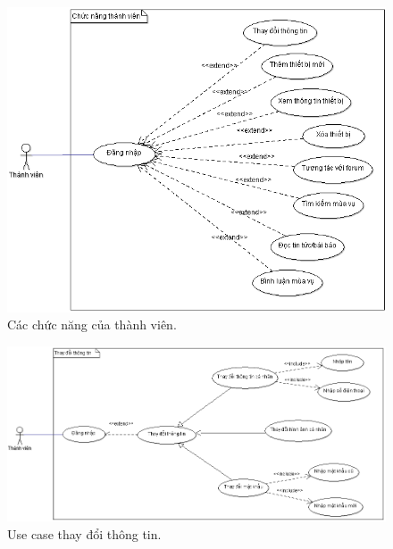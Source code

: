 \documentclass[a4paper,12pt,oneside]{article}
\begin{document}
\begin{figure}[H]
	\centering
	\includegraphics[scale=.9]{hinh/cntv.png}
	\caption{Các chức năng của thành viên.}
\end{figure}

\newpage
\begin{figure}[H]
	\centering
	\includegraphics[scale=.6]{hinh/tdtt.png}
	\caption{Use case thay đổi thông tin.}
\end{figure}
\end{document}

